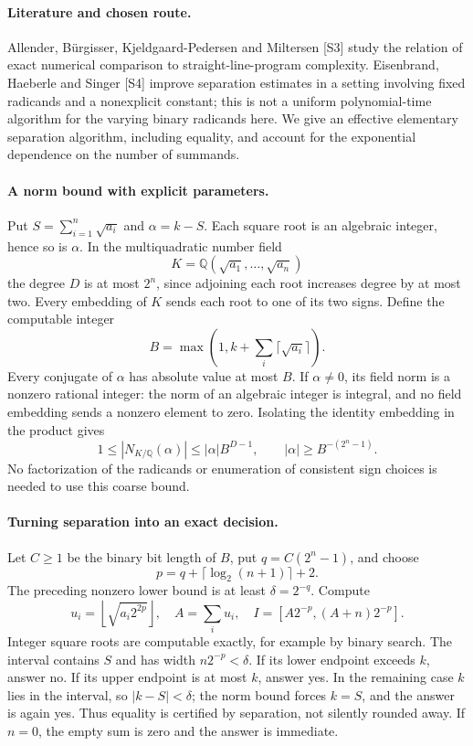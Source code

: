 \documentclass[11pt,a4paper]{article}
\begin{document}
\paragraph{Literature and chosen route.}
Allender, Bürgisser, Kjeldgaard-Pedersen and Miltersen [S3] study the relation of exact numerical comparison to straight-line-program complexity. Eisenbrand, Haeberle and Singer [S4] improve separation estimates in a setting involving fixed radicands and a nonexplicit constant; this is not a uniform polynomial-time algorithm for the varying binary radicands here. We give an effective elementary separation algorithm, including equality, and account for the exponential dependence on the number of summands.

\paragraph{A norm bound with explicit parameters.}
Put $S=\sum_{i=1}^n\sqrt{a_i}$ and $\alpha=k-S$. Each square root is an algebraic integer, hence so is $\alpha$. In the multiquadratic number field
\[
 K=\mathbb Q(\sqrt{a_1},\ldots,\sqrt{a_n})
\]
the degree $D$ is at most $2^n$, since adjoining each root increases degree by at most two. Every embedding of $K$ sends each root to one of its two signs. Define the computable integer
\[
 B=\max\left(1,k+\sum_i\lceil\sqrt{a_i}\rceil\right).
\]
Every conjugate of $\alpha$ has absolute value at most $B$. If $\alpha\ne0$, its field norm is a nonzero rational integer: the norm of an algebraic integer is integral, and no field embedding sends a nonzero element to zero. Isolating the identity embedding in the product gives
\[
 1\le|N_{K/\mathbb Q}(\alpha)|\le|\alpha|B^{D-1},
 \qquad |\alpha|\ge B^{-(2^n-1)}.
\]
No factorization of the radicands or enumeration of consistent sign choices is needed to use this coarse bound.

\paragraph{Turning separation into an exact decision.}
Let $C\ge1$ be the binary bit length of $B$, put $q=C(2^n-1)$, and choose
\[
 p=q+\lceil\log_2(n+1)\rceil+2.
\]
The preceding nonzero lower bound is at least $\delta=2^{-q}$. Compute
\[
 u_i=\left\lfloor\sqrt{a_i2^{2p}}\right\rfloor,
 \quad A=\sum_i u_i,
 \quad I=[A2^{-p},(A+n)2^{-p}].
\]
Integer square roots are computable exactly, for example by binary search. The interval contains $S$ and has width $n2^{-p}<\delta$. If its lower endpoint exceeds $k$, answer no. If its upper endpoint is at most $k$, answer yes. In the remaining case $k$ lies in the interval, so $|k-S|<\delta$; the norm bound forces $k=S$, and the answer is again yes. Thus equality is certified by separation, not silently rounded away. If $n=0$, the empty sum is zero and the answer is immediate.
\end{document}
